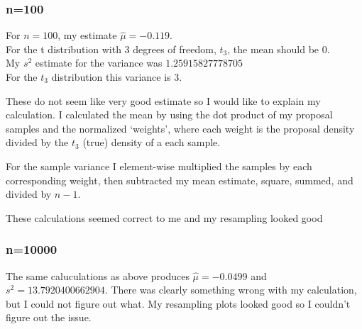 \subsubsection*{n=100}
\noindent For $n=100$, my estimate $\hat{\mu} = -0.119$.\\
For the t distribution with 3 degrees of freedom, $t_3$, the mean should be 0.\\
My $s^2$ estimate for the variance was $1.25915827778705$\\
For the $t_3$ distribution this variance is 3.

These do not seem like very good estimate so I would like to explain my calculation. 
I calculated the mean by using the dot product of my proposal samples and the normalized `weights', 
where each weight is the proposal density divided by the $t_3$ (true) density of a each sample.

For the sample variance I element-wise multiplied the samples by each corresponding weight,
then subtracted my mean estimate, square, summed, and divided by $n-1$.

These calculations seemed correct to me and my resampling looked good

\subsubsection*{n=10000}
The same caluculations as above produces $\hat{\mu} = -0.0499$ and $s^2 = 13.7920400662904$.
There was clearly something wrong with my calculation, but I could not figure out what.
My resampling plots looked good so I couldn't figure out the issue.


